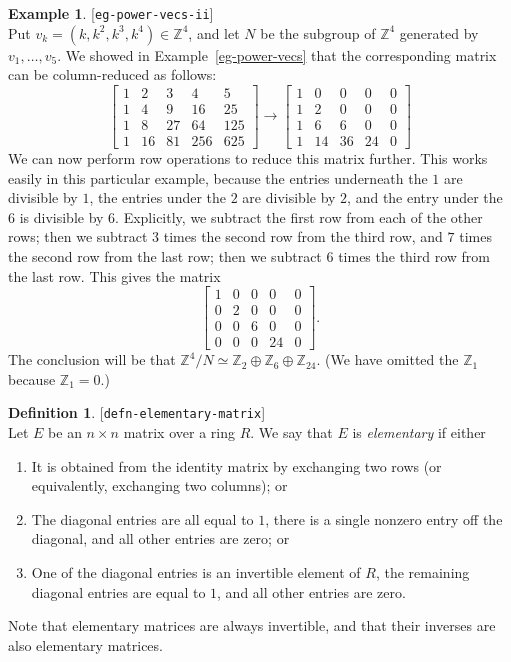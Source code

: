 \documentclass{amsart}
\newcommand{\lbl}[1]{\label{#1}\textup{[\texttt{#1}]}\ \\}
\newcommand{\lbl}{\label}
\newcommand{\bbm}       {\left[\begin{matrix}}
\newcommand{\ebm}       {\end{matrix}\right]}
\newcommand{\Z}         {{\mathbb{Z}}}
\newcommand{\tm}        {\times}
\newcommand{\xra}       {\xrightarrow}
\newcommand{\op}        {\oplus}
\renewcommand{\:}{\colon}
\theoremstyle{definition}
\newtheorem{definition}[theorem]{Definition}
\newtheorem{example}[theorem]{Example}
\begin{document}
\begin{example}\lbl{eg-power-vecs-ii}
 Put $v_k=(k,k^2,k^3,k^4)\in\Z^4$, and let $N$ be the subgroup of
 $\Z^4$ generated by $v_1,\ldots,v_5$.  We showed in
 Example~\ref{eg-power-vecs} that the corresponding matrix can be
 column-reduced as follows:
 \[
  \bbm 1&2&3&4&5\\
       1&4&9&16&25\\
       1&8&27&64&125\\
       1&16&81&256&625
  \ebm
 \xra{} 
  \bbm 1&0&0&0&0\\
       1&2&0&0&0\\
       1&6&6&0&0\\
       1&14&36&24&0
  \ebm
 \]
 We can now perform row operations to reduce this matrix further.
 This works easily in this particular example, because the entries
 underneath the $1$ are divisible by $1$, the entries under the $2$
 are divisible by $2$, and the entry under the $6$ is divisible by
 $6$.  Explicitly, we subtract the first row from each of the other
 rows; then we subtract $3$ times the second row from the third row,
 and $7$ times the second row from the last row; then we subtract $6$
 times the third row from the last row.  This gives the matrix
 \[ 
  \bbm 1&0&0&0&0\\
       0&2&0&0&0\\
       0&0&6&0&0\\
       0&0&0&24&0
  \ebm.
 \]
 The conclusion will be that $\Z^4/N\simeq\Z_2\op\Z_6\op\Z_{24}$.  (We
 have omitted the $\Z_1$ because $\Z_1=0$.)
\end{example}


\begin{definition}\lbl{defn-elementary-matrix}
 Let $E$ be an $n\tm n$ matrix over a ring $R$.  We say that $E$ is
 \emph{elementary} if either
 \begin{enumerate}
 \item It is obtained from the identity matrix by exchanging two rows
  (or equivalently, exchanging two columns); or
 \item The diagonal entries are all equal to $1$, there is a single
  nonzero entry off the diagonal, and all other entries are zero; or
 \item One of the diagonal entries is an invertible element of $R$,
  the remaining diagonal entries are equal to $1$, and all other
  entries are zero.
 \end{enumerate}
 Note that elementary matrices are always invertible, and that their
 inverses are also elementary matrices.
\end{definition}
\end{document}
